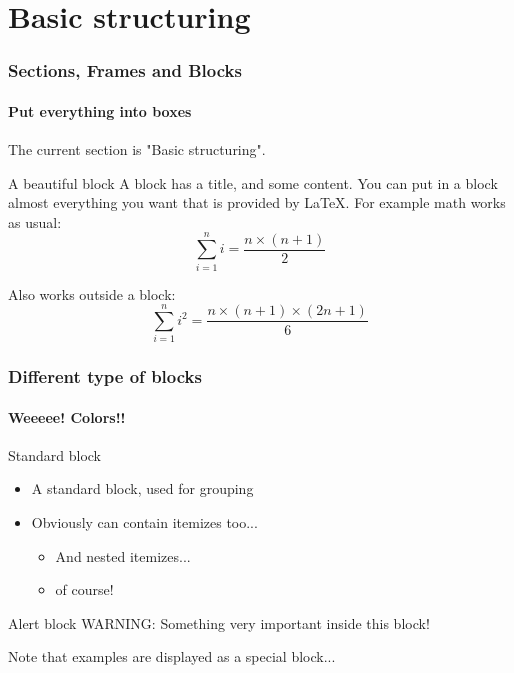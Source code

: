 \documentclass[12pt,aspectratio=169]{beamer}
\begin{document}
\section{Basic structuring}
\begin{frame}
  \frametitle{Sections, Frames and Blocks}
  \framesubtitle{Put everything into boxes}

  The current section is "Basic structuring". 

  \begin{block}{A beautiful block}
  A block has a title, and some content. You can put in a block
  almost everything you want that is provided by LaTeX. For example
  math works as usual:
    \begin{equation}
    \sum_{i=1}^n i = \frac{n \times (n+1)}{2}
    \end{equation}
  \end{block}

  Also works outside a block:
  \begin{equation}
  \sum_{i=1}^n i^2 = \frac{n \times (n+1) \times (2n+1)}{6}
  \end{equation}
\end{frame}

\begin{frame}
  \frametitle{Different type of blocks}
  \framesubtitle{Weeeee! Colors!!}
  \begin{block}{Standard block}
  \begin{itemize}
    \item A standard block, used for grouping
    \item Obviously can contain itemizes too...
    \begin{itemize}
      \item And nested itemizes...
      \item of course!
    \end{itemize}
  \end{itemize}
  \end{block}
  \begin{alertblock}{Alert block}
  WARNING: Something very important inside this block!
  \end{alertblock}
  \begin{example}
  Note that examples are displayed as a special block...
  \end{example}
\end{frame}
\end{document}

